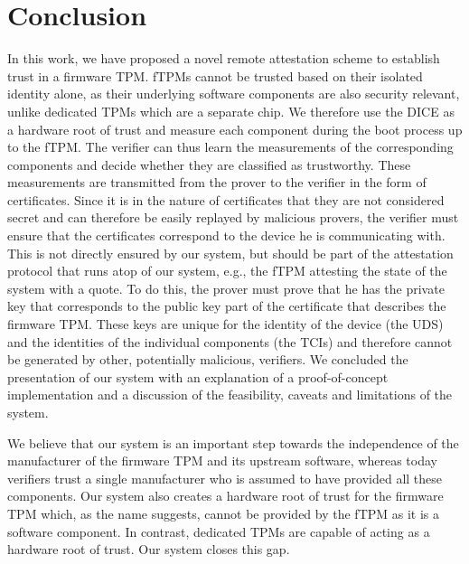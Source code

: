 

\section{Conclusion}

In this work, we have proposed a novel remote attestation scheme to establish trust in a firmware TPM\@.
fTPMs cannot be trusted based on their isolated identity alone, as their underlying software components are also security relevant, unlike dedicated TPMs which are a separate chip.
We therefore use the DICE as a hardware root of trust and measure each component during the boot process up to the fTPM\@.
The verifier can thus learn the measurements of the corresponding components and decide whether they are classified as trustworthy.
These measurements are transmitted from the prover to the verifier in the form of certificates.
Since it is in the nature of certificates that they are not considered secret and can therefore be easily replayed by malicious provers, the verifier must ensure that the certificates correspond to the device he is communicating with.
This is not directly ensured by our system, but should be part of the attestation protocol that runs atop of our system, e.g., the fTPM attesting the state of the system with a quote.
To do this, the prover must prove that he has the private key that corresponds to the public key part of the certificate that describes the firmware TPM\@.
These keys are unique for the identity of the device (the \ac{UDS}) and the identities of the individual components (the TCIs) and therefore cannot be generated by other, potentially malicious, verifiers.
We concluded the presentation of our system with an explanation of a proof-of-concept implementation and a discussion of the feasibility, caveats and limitations of the system.

We believe that our system is an important step towards the independence of the manufacturer of the firmware TPM and its upstream software, whereas today verifiers trust a single manufacturer who is assumed to have provided all these components.
Our system also creates a hardware root of trust for the firmware TPM which, as the name suggests, cannot be provided by the fTPM as it is a software component.
In contrast, dedicated TPMs are capable of acting as a hardware root of trust.
Our system closes this gap.
